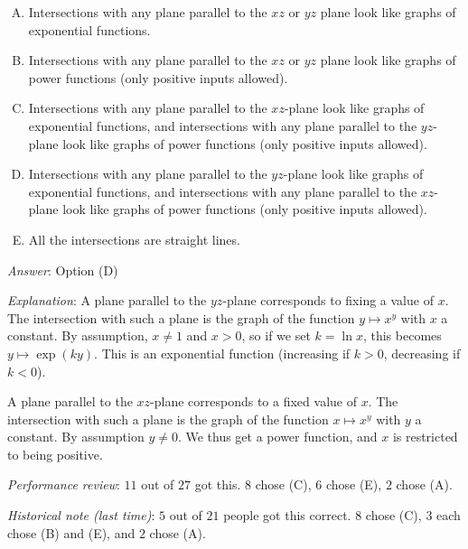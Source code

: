\documentclass[10pt]{amsart}
\begin{document}
\begin{enumerate}
  \begin{enumerate}[(A)]
  \item Intersections with any plane parallel to the $xz$ or $yz$
    plane look like graphs of exponential functions.
  \item Intersections with any plane parallel to the $xz$ or $yz$
    plane look like graphs of power functions (only positive inputs allowed).
  \item Intersections with any plane parallel to the $xz$-plane look
    like graphs of exponential functions, and intersections with any
    plane parallel to the $yz$-plane look like graphs of power
    functions (only positive inputs allowed).
  \item Intersections with any plane parallel to the $yz$-plane look
    like graphs of exponential functions, and intersections with any
    plane parallel to the $xz$-plane look like graphs of power
    functions (only positive inputs allowed).
  \item All the intersections are straight lines.
  \end{enumerate}

  {\em Answer}: Option (D)

  {\em Explanation}: A plane parallel to the $yz$-plane corresponds to
  fixing a value of $x$. The intersection with such a plane is the
  graph of the function $y \mapsto x^y$ with $x$ a constant. By
  assumption, $x \ne 1$ and $x > 0$, so if we set $k = \ln x$, this
  becomes $y \mapsto \exp(ky)$. This is an exponential function
  (increasing if $k > 0$, decreasing if $k < 0$).

  A plane parallel to the $xz$-plane corresponds to a fixed value of
  $x$. The intersection with such a plane is the graph of the function
  $x \mapsto x^y$ with $y$ a constant. By assumption $y \ne 0$. We
  thus get a power function, and $x$ is restricted to being positive.

  {\em Performance review}: $11$ out of $27$ got this. $8$ chose (C),
  $6$ chose (E), $2$ chose (A).

  {\em Historical note (last time)}: $5$ out of $21$ people got this
  correct. $8$ chose (C), $3$ each chose (B) and (E), and $2$ chose
  (A).
\end{enumerate}
\end{document}
